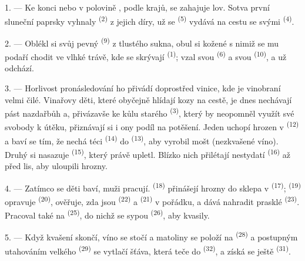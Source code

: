 1. --- Ke konci  nebo v polovině , podle krajů, se zahajuje lov.
Sotva první sluneční paprsky vyhnaly  \textsuperscript{(2)} z jejich díry, už
se  \textsuperscript{(5)} vydává na cestu se svými
 \textsuperscript{(4)}.

2. --- Oblékl si svůj pevný  \textsuperscript{(9)} z tlustého sukna,
obul si kožené  s nimiž se mu podaří chodit ve vlhké trávě, kde se skrývají
 \textsuperscript{(1)}; vzal svou  \textsuperscript{(6)} a svou
 \textsuperscript{(10)}, a už odchází.

3. --- Horlivost pronásledování ho přivádí doprostřed vinice, kde je vinobraní velmi čilé.
Vinařovy děti, které obyčejně hlídají kozy na cestě, je dnes nechávají pást nazdařbůh a,
přivázavše ke kůlu starého  \textsuperscript{(3)}, který by neopomněl využít své
svobody k útěku, přiznávají si i ony podíl na potěšení. Jeden uchopí hrozen v
 \textsuperscript{(12)} a baví se tím, že nechá téci 
\textsuperscript{(14)} do  \textsuperscript{(13)}, aby vyrobil mošt (nezkvašené
víno). Druhý si nasazuje
 \textsuperscript{(15)}, který právě upletl. Blízko nich
přilétají nestydatí  \textsuperscript{(16)} až před lis, aby uloupili hrozny.

4. --- Zatímco se děti baví, muži pracují.  \textsuperscript{(18)} přinášejí
hrozny do sklepa v  \textsuperscript{(17)}; 
\textsuperscript{(19)} opravuje  \textsuperscript{(20)}, ověřuje, zda jsou
 \textsuperscript{(22)} a
 \textsuperscript{(21)} v pořádku, a dává nahradit prasklé
 \textsuperscript{(23)}. Pracoval také na 
\textsuperscript{(25)}, do nichž se sypou  \textsuperscript{(26)}, aby kvasily.

5. --- Když kvašení skončí, víno se stočí a matoliny se položí na 
\textsuperscript{(28)} a postupným utahováním velkého  \textsuperscript{(29)}
se vytlačí šťáva, která teče do  \textsuperscript{(32)}, a získá se ještě
 \textsuperscript{(31)}.

\VUsaut{6.0mm}
\VUsaut{3.4mm}

